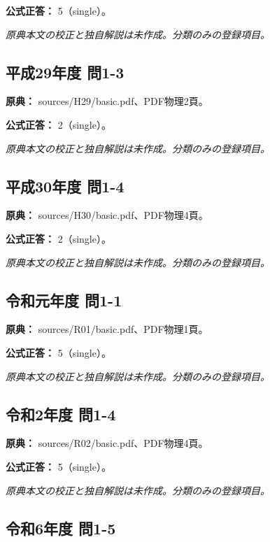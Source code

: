 \textbf{公式正答：} 5（single）。

\par\textit{原典本文の校正と独自解説は未作成。分類のみの登録項目。}

\subsection{平成29年度 問1-3}
\label{q:h29-reg-basic-1-3}

\noindent\textbf{原典：} sources/H29/basic.pdf、PDF物理2頁。

\textbf{公式正答：} 2（single）。

\par\textit{原典本文の校正と独自解説は未作成。分類のみの登録項目。}

\subsection{平成30年度 問1-4}
\label{q:h30-reg-basic-1-4}

\noindent\textbf{原典：} sources/H30/basic.pdf、PDF物理4頁。

\textbf{公式正答：} 2（single）。

\par\textit{原典本文の校正と独自解説は未作成。分類のみの登録項目。}

\subsection{令和元年度 問1-1}
\label{q:r01-reg-basic-1-1}

\noindent\textbf{原典：} sources/R01/basic.pdf、PDF物理1頁。

\textbf{公式正答：} 5（single）。

\par\textit{原典本文の校正と独自解説は未作成。分類のみの登録項目。}

\subsection{令和2年度 問1-4}
\label{q:r02-reg-basic-1-4}

\noindent\textbf{原典：} sources/R02/basic.pdf、PDF物理4頁。

\textbf{公式正答：} 5（single）。

\par\textit{原典本文の校正と独自解説は未作成。分類のみの登録項目。}

\subsection{令和6年度 問1-5}
\label{q:r06-reg-basic-1-5}

